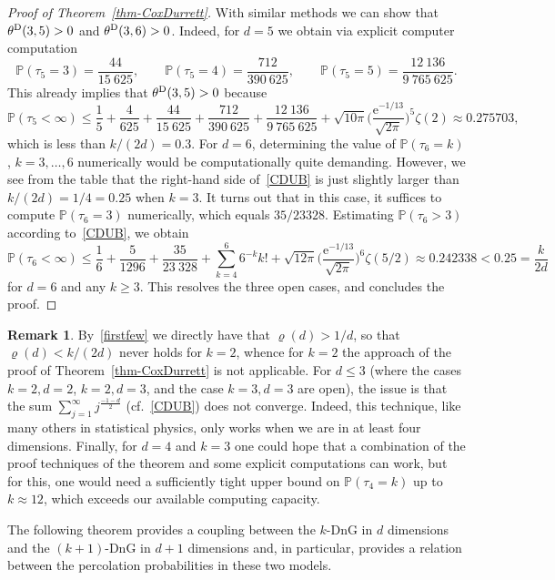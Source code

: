 \documentclass[oneside]{amsart}
\newcommand{\e}{\mathrm e}
\theoremstyle{definition}
\newtheorem{remark}[theorem]{Remark}
\renewcommand{\P}{\mathbb{P}}
\newcommand{\1}{\mathbbm{1}}
\newcommand{\0}{\mathbf{o}}
\numberwithin{equation}{section}
\begin{document}
\begin{proof}[Proof of Theorem~\ref{thm-CoxDurrett}]
With similar methods we can show that $\theta^{\rm D}(3,5)>0$ and $\theta^{\rm D}(3,6)>0$. Indeed, for $d=5$ we obtain via explicit computer computation
\[ \P(\tau_5=3)=\frac{44}{15\ 625}, \qquad \P(\tau_5=4)=\frac{712}{390\  625}, \qquad \P(\tau_5=5)=\frac{12\ 136}{9\ 765\ 625}. \]
This already implies that  $\theta^{\rm D}(3,5)>0$ because
\[ \P(\tau_5<\infty) \leq \frac{1}{5} + \frac{4}{625} + \frac{44}{15\ 625} + \frac{712}{390\  625} + \frac{12\ 136}{9\ 765\ 625} + \sqrt{10\pi} \Big( \frac{\e^{-1/13}}{\sqrt{2\pi}} \Big)^5 \zeta(2) \approx 0.275703, \]
which is less than $k/(2d)=0.3$. For $d=6$, determining the value of $\P(\tau_6=k)$, $k=3,\ldots,6$ numerically would be computationally quite demanding. However, we see from the table that the right-hand side of~\eqref{CDUB} is just slightly larger than $k/(2d)=1/4=0.25$ when $k=3$. It turns out that in this case, it suffices to compute $\P(\tau_6=3)$ numerically, which equals $35/23328$. Estimating $\P(\tau_6>3)$ according to~\eqref{CDUB}, we obtain
\[ \P(\tau_6<\infty) \leq \frac{1}{6} + \frac{5}{1296} + \frac{35}{23\ 328} + \sum_{k=4}^6 6^{-k} k! + \sqrt{12\pi} \Big( \frac{\e^{-1/13}}{\sqrt{2\pi}} \Big)^6 \zeta(5/2) \approx 0.242338 < 0.25=\frac{k}{2d} \]
for $d=6$ and any $k\geq 3$. This resolves the three open cases, and concludes the proof. 
\end{proof}
\begin{remark}
By~\eqref{firstfew} we directly have that $\varrho(d) >1/d$, so that $\varrho(d)<k/(2d)$ never holds for $k=2$, whence for $k=2$ the approach of the proof of Theorem~\ref{thm-CoxDurrett} is not applicable. For $d\leq 3$ (where the cases $k=2,d=2$, $k=2,d=3$, and the case $k=3,d=3$ are open), the issue is that the sum $\sum_{j=1}^{\infty} j^{\frac{-1-d}{2}}$ (cf.\ \eqref{CDUB}) does not converge. Indeed, this technique, like many others in statistical physics, only works when we are in at least four dimensions.
Finally, for $d=4$ and $k=3$ one could hope that a combination of the proof techniques of the theorem and some explicit computations can work, but for this, one would need a sufficiently tight upper bound on $\P(\tau_4 = k)$ up to $k \approx 12$, which exceeds our available computing capacity. 
\end{remark}

The following theorem provides a coupling between the $k$-DnG in $d$ dimensions and the $(k+1)$-DnG in $d+1$ dimensions and, in particular, provides a relation between the percolation probabilities in these two models.
\end{document}

